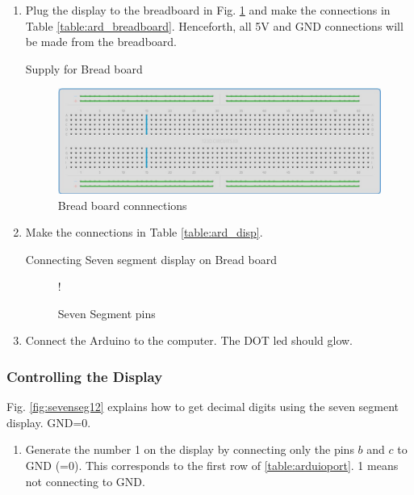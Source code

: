 \begin{enumerate}[label=\arabic*.,ref=\theenumi]
\begin{enumerate}[label=\arabic*.,ref=\theenumi]
\item
	Plug the display to the breadboard in Fig. \ref{fig:breadboard} and make the connections in Table \ref{table:ard_breadboard}.  Henceforth, all 5V and GND connections will be made from the breadboard.

\begin{table}[!ht]
\centering

\caption{Supply for Bread board}
\label{table:ard_breadboard}
\end{table}

\begin{figure}[!ht]
\begin{center}
\includegraphics[width=\columnwidth]{vaman/esp32/sevenseg/figs/breadboard}
\end{center}
\caption{Bread board connnections}
\label{fig:breadboard}
\end{figure}


%
\item
Make the  connections in Table \ref{table:ard_disp}.  
%
\begin{table}[!ht]
\centering

\caption{Connecting Seven segment display on Bread board}
\label{table:ard_disp}
\end{table}

%
%
\begin{figure}[!ht]
\begin{center}
 {!} {

}
\end{center}
\caption{Seven Segment pins}
\label{fig:sevenseg}
\end{figure}

%
\item
	Connect the Arduino to the computer. The DOT led should glow.
\end{enumerate}
\subsubsection{Controlling the Display}
Fig. \ref{fig:sevenseg12} explains how to get decimal digits using the seven segment display. GND=0.  
\begin{enumerate}[label=\arabic*.,ref=\theenumi]
\item	Generate the number 1 on the display by connecting only the pins $b$ and $c$ to GND (=0). This corresponds to the  first row of \ref{table:arduioport}. 1 means not connecting to GND.
	

\end{enumerate}
\end{enumerate}
